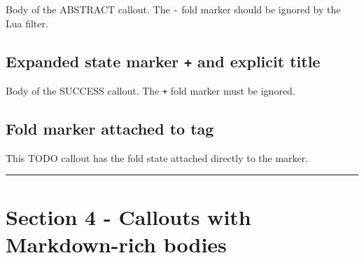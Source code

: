 \begin{tcolorbox}[breakable,colback=ocGryBack,colframe=ocGryFrame,coltitle=ocGryTitle,left=3mm,boxed title style={left=1mm},title={\hspace*{-2.5mm}\iconInfo\; md2pdf - inner without explicit \texttt{shift-heading=0}}]
\begin{tcolorbox}[breakable,colback=ocGryBack,colframe=ocGryFrame,coltitle=ocGryTitle,left=3mm,boxed title style={left=1mm},title={\hspace*{-2.5mm}\iconTldr\; Abstract with fold marker}]

Body of the ABSTRACT callout. The \texttt{-} fold marker should be
ignored by the Lua filter.

\end{tcolorbox}

\subsection*{\texorpdfstring{Expanded state marker \texttt{+} and
explicit
title}{Expanded state marker + and explicit title}}\label{inner-2-expanded-state-marker-and-explicit-title}

\begin{tcolorbox}[breakable,colback=ocGreBack,colframe=ocGreFrame,coltitle=ocGreTitle,left=3mm,boxed title style={left=1mm},title={\hspace*{-2.5mm}\iconCheck\; Title with plus marker}]

Body of the SUCCESS callout. The \texttt{+} fold marker must be ignored.

\end{tcolorbox}

\subsection*{Fold marker attached to
tag}\label{inner-2-fold-marker-attached-to-tag}

\begin{tcolorbox}[breakable,colback=yellow!5!white,colframe=yellow!50!black,left=3mm,boxed title style={left=1mm},title={\hspace*{-2.5mm}\iconTodo\; TODO}]

This TODO callout has the fold state attached directly to the marker.

\end{tcolorbox}

\begin{center}\rule{0.5\linewidth}{0.5pt}\end{center}

\section*{Section 4 - Callouts with Markdown-rich
bodies}\label{inner-2-section-4---callouts-with-markdown-rich-bodies}


\end{tcolorbox}
